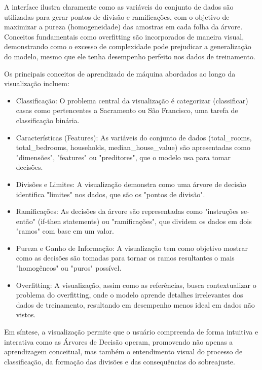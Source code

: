 \documentclass[conference]{IEEEtran}
\begin{document}
A interface ilustra claramente como as variáveis do conjunto de dados são utilizadas para gerar pontos de divisão e ramificações, com o objetivo de maximizar a pureza (homogeneidade) das amostras em cada folha da árvore. Conceitos fundamentais como overfitting são incorporados de maneira visual, demonstrando como o excesso de complexidade pode prejudicar a generalização do modelo, mesmo que ele tenha desempenho perfeito nos dados de treinamento.

Os principais conceitos de aprendizado de máquina abordados ao longo da visualização incluem:

\begin{itemize}
    \item Classificação: O problema central da visualização é categorizar (classificar) casas como pertencentes a 
    Sacramento ou São Francisco, uma tarefa de classificação binária.
    \item Características (Features): As variáveis do conjunto de dados (total\_rooms, total\_bedrooms, households, median\_house\_value)
    são apresentadas como "dimensões", "features" ou "preditores", que o modelo usa para tomar decisões.
    \item Divisões e Limites: A visualização demonstra como uma árvore de decisão identifica "limites" 
    nos dados, que são os "pontos de divisão".
    \item Ramificações: As decisões da árvore são representadas como "instruções se-então" (if-then statements) 
    ou "ramificações", que dividem os dados em dois "ramos" com base em um valor.
    \item Pureza e Ganho de Informação: A visualização tem como objetivo mostrar como as 
    decisões são tomadas para tornar os ramos resultantes o mais "homogêneos" ou "puros" possível. 
    \item Overfitting: A visualização, assim como as referências, busca contextualizar o problema do overfitting, 
    onde o modelo aprende detalhes irrelevantes dos dados de treinamento, resultando em desempenho menos ideal em dados não vistos.
\end{itemize}

Em síntese, a visualização permite que o usuário compreenda de forma intuitiva e interativa como as Árvores de Decisão operam, promovendo não apenas a aprendizagem conceitual, mas também o entendimento visual do processo de classificação, da formação das divisões e das consequências do sobreajuste.
\end{document}

